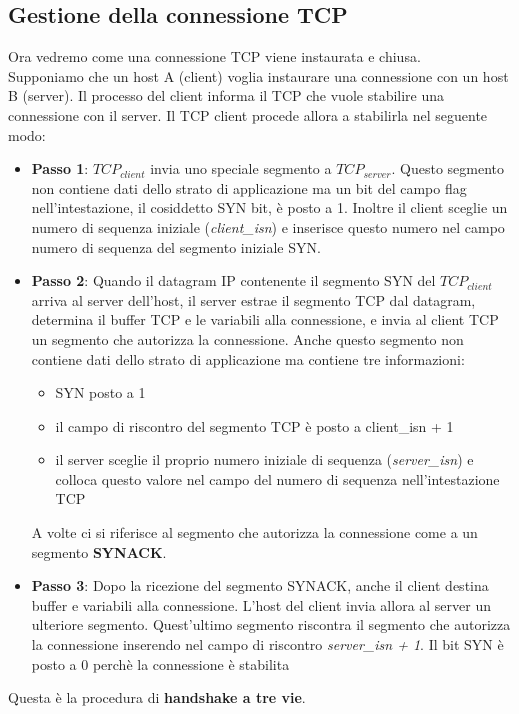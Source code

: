\documentclass[11pt,a4paper]{book}
\begin{document}
\subsection{Gestione della connessione TCP}
Ora vedremo come una connessione TCP viene instaurata e chiusa. \\
Supponiamo che un host A (client) voglia instaurare una connessione con un host B (server). Il processo del client informa il TCP che vuole stabilire una connessione con il server. Il TCP client procede allora a stabilirla nel seguente modo:
\begin{itemize}
	\item \textbf{Passo 1}: $TCP_{client}$ invia uno speciale segmento a $TCP_{server}$. Questo segmento non contiene dati dello strato di applicazione ma un bit del campo flag nell'intestazione, il cosiddetto SYN bit, è posto a 1. Inoltre il client sceglie un numero di sequenza iniziale (\emph{client\_isn}) e inserisce questo numero nel campo numero di sequenza del segmento iniziale SYN.
	\item \textbf{Passo 2}: Quando il datagram IP contenente il segmento SYN del $TCP_{client}$ arriva al server dell'host, il server estrae il segmento TCP dal datagram, determina il buffer TCP e le variabili alla connessione, e invia al client TCP un segmento che autorizza la connessione. Anche questo segmento non contiene dati dello strato di applicazione ma contiene tre informazioni:
		\begin{itemize}
			\item SYN posto a 1
			\item il campo di riscontro del segmento TCP è posto a client\_isn + 1
			\item il server sceglie il proprio numero iniziale di sequenza (\emph{server\_isn}) e colloca questo valore nel campo del numero di sequenza nell'intestazione TCP	
		\end{itemize}
		A volte ci si riferisce al segmento che autorizza la connessione come a un segmento \textbf{SYNACK}.
	\item \textbf{Passo 3}: Dopo la ricezione del segmento SYNACK, anche il client destina buffer e variabili alla connessione. L'host del client invia allora al server un ulteriore segmento. Quest'ultimo segmento riscontra il segmento che autorizza la connessione inserendo nel campo di riscontro \emph{server\_isn + 1}. Il bit SYN è posto a 0 perchè la connessione è stabilita
\end{itemize}
Questa è la procedura di \textbf{handshake a tre vie}.
\end{document}
